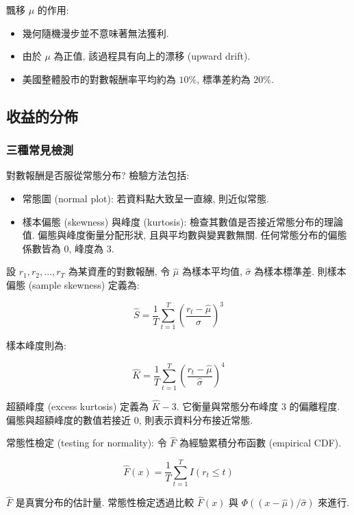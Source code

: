 \documentclass[letterpaper]{article}
\begin{document}
		
		飄移 $\mu$ 的作用: 
		
		\begin{itemize}
			\item 幾何隨機漫步並不意味著無法獲利. 
			\item 由於 \(\mu\) 為正值, 該過程具有向上的漂移 (upward drift). 
			\item 美國整體股市的對數報酬率平均約為 \(10\%\), 標準差約為 \(20\%\). 
		\end{itemize}
		
		\subsection{收益的分佈}
		\subsubsection{三種常見檢測}
		對數報酬是否服從常態分布? 檢驗方法包括: 
		
		\begin{itemize}
			\item 常態圖 (normal plot): 若資料點大致呈一直線, 則近似常態. 
			\item 樣本偏態 (skewness) 與峰度 (kurtosis): 檢查其數值是否接近常態分布的理論值. 偏態與峰度衡量分配形狀, 且與平均數與變異數無關. 任何常態分布的偏態係數皆為 0, 峰度為 3. 
		\end{itemize}
		
		設 \( r_{1}, r_{2}, \ldots, r_{T} \) 為某資產的對數報酬, 令 \(\hat{\mu}\) 為樣本平均值, \(\hat{\sigma}\) 為樣本標準差. 則樣本偏態 (sample skewness) 定義為: 
		
		$$
		\hat{S}=\frac{1}{T} \sum_{t=1}^{T}\left (\frac{r_{t}-\hat{\mu}}{\hat{\sigma}}\right) ^{3}
		$$
		
		樣本峰度則為: 
		
		$$
		\hat{K}=\frac{1}{T} \sum_{t=1}^{T}\left (\frac{r_{t}-\hat{\mu}}{\hat{\sigma}}\right) ^{4}
		$$
		
		超額峰度 (excess kurtosis) 定義為 \(\hat{K} - 3\). 它衡量與常態分布峰度 3 的偏離程度. 偏態與超額峰度的數值若接近 0, 則表示資料分布接近常態. 
		
		
		常態性檢定 (testing for normality):  令 \(\hat{F}\) 為經驗累積分布函數 (empirical CDF). 
		
		$$
		\hat{F} (x) =\frac{1}{T} \sum_{t=1}^{T} I\left (r_{t} \leq t\right) 
		$$
		
		\(\hat{F}\) 是真實分布的估計量. 
		常態性檢定透過比較 \(\hat{F} (x) \) 與 \(\Phi ( (x - \hat{\mu}) / \hat{\sigma}) \) 來進行. 
		
\end{document}
